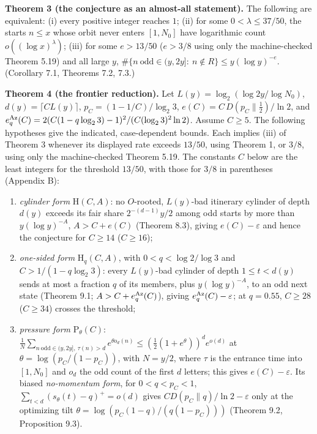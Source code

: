 \documentclass[11pt,a4paper]{article}
\begin{document}
\textbf{Theorem 3 (the conjecture as an almost-all statement).} The
following are equivalent: (i) every positive integer reaches \(1\); (ii)
for some \(0<\lambda\le37/50\), the starts \(n\le x\) whose orbit never
enters \([1,N_0]\) have logarithmic count \(o((\log x)^{\lambda})\);
(iii) for some \(e>13/50\) (\(e>3/8\) using only the machine-checked
Theorem 5.19) and all large \(y\),
\(\#\{n\ \text{odd}\in(y,2y]:\ n\notin R\}\le y(\log y)^{-e}\).
(Corollary 7.1, Theorems 7.2, 7.3.)

\textbf{Theorem 4 (the frontier reduction).} Let
\(L(y)=\log_2(\log 2y/\log N_0)\), \(d(y)=\lceil CL(y)\rceil\),
\(p_C=(1-1/C)/\log_2 3\), \(e(C)=C\,D(p_C\|\tfrac12)/\ln 2\), and
\(e_q^{\rm Az}(C)=2(C(1-q\log_2 3)-1)^2/
(C(\log_2 3)^2\ln2)\). Assume \(C\ge5\). The following hypotheses give
the indicated, case-dependent bounds. Each implies (iii) of Theorem 3
whenever its displayed rate exceeds \(13/50\), using Theorem 1, or
\(3/8\), using only the machine-checked Theorem 5.19. The constants
\(C\) below are the least integers for the threshold \(13/50\), with
those for \(3/8\) in parentheses (Appendix B):

\begin{enumerate}
\def\labelenumi{(\alph{enumi})}
\item
  \emph{cylinder form} \(\mathrm H(C,A)\): no \(O\)-rooted, \(L(y)\)-bad
  itinerary cylinder of depth \(d(y)\) exceeds its fair share
  \(2^{-(d-1)}y/2\) among odd starts by more than \(y(\log y)^{-A}\),
  \(A>C+e(C)\) (Theorem 8.3), giving \(e(C)-\varepsilon\) and hence the
  conjecture for \(C\ge14\) (\(C\ge16\));
\item
  \emph{one-sided form} \(\mathrm H_q(C,A)\), with \(0<q<\log 2/\log 3\)
  and \(C>1/(1-q\log_2 3)\): every \(L(y)\)-bad cylinder of depth
  \(1\le t<d(y)\) sends at most a fraction \(q\) of its members, plus
  \(y(\log y)^{-A}\), to an odd next state (Theorem 9.1;
  \(A>C+e_q^{\rm Az}(C)\)), giving \(e_q^{\rm Az}(C)-\varepsilon\); at
  \(q=0.55\), \(C\ge28\) (\(C\ge34\)) crosses the threshold;
\item
  \emph{pressure form} \(\mathrm P_\theta(C)\):
  \(\frac1N\sum_{n\ \mathrm{odd}\in(y,2y],\ \tau(n)>d}e^{\theta o_d(n)}\le(\tfrac12(1+e^{\theta}))^{d}e^{o(d)}\)
  at \(\theta=\log(p_C/(1-p_C))\), with \(N=y/2\), where \(\tau\) is the
  entrance time into \([1,N_0]\) and \(o_d\) the odd count of the first
  \(d\) letters; this gives \(e(C)-\varepsilon\). Its biased
  \emph{no-momentum form}, for \(0<q<p_C<1\),
  \(\sum_{t<d}(s_\theta(t)-q)^+=o(d)\) gives
  \(C D(p_C\|q)/\ln2-\varepsilon\) only at the optimizing tilt
  \(\theta=\log(p_C(1-q)/(q(1-p_C)))\) (Theorem 9.2, Proposition 9.3).
\end{enumerate}
\end{document}
